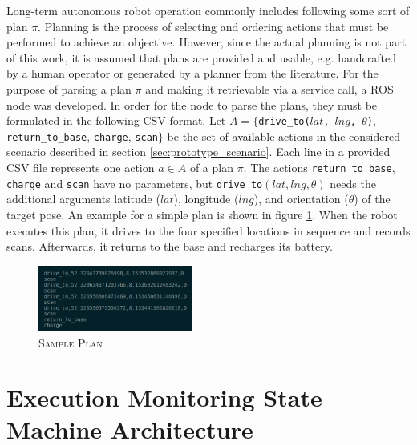 \documentclass[english, master, utf8]{base/thesis_KBS}
\newcommand{\code}[1]{\colorbox{light-gray}{\texttt{#1}}}
\begin{document}
Long-term autonomous robot operation commonly includes following some sort of plan $\pi$. Planning is the process of selecting and ordering actions that must be performed to
achieve an objective. \cite{GNT:2016} However, since the actual planning is not part of this work, it is assumed that
plans are provided and usable, e.g. handcrafted by a human operator or generated by a planner from the literature.
For the purpose of parsing a plan $\pi$ and making it retrievable via a service call, a ROS node was developed.
In order for the node to parse the plans, they must be formulated in the following CSV format.
Let $A = \{$\code{drive\_to($lat$, $lng$, $\theta$)}, \code{return\_to\_base}, \code{charge}, \code{scan}$\}$ be the set of available actions in the considered scenario
described in section \ref{sec:prototype_scenario}.
Each line in a provided CSV file represents one action $a \in A$ of a plan $\pi$. The actions \code{return\_to\_base}, \code{charge} and \code{scan} have no parameters,
but \code{drive\_to$(lat, lng, \theta)$} needs the additional arguments latitude ($lat$), longitude ($lng$), and orientation ($\theta$) of the target pose.
An example for a simple plan is shown in figure \ref{fig:plan_example}. 
When the robot executes this plan, it drives to the four specified locations in sequence and records scans.
Afterwards, it returns to the base and recharges its battery.
\begin{figure}[H]
    \centering
    \includegraphics[width=0.45\textwidth]{pics/plan_example.png}
    \caption{\textsc{Sample Plan}}
    \label{fig:plan_example}
\end{figure}
\noindent

\section{Execution Monitoring State Machine Architecture}
\label{sec:execution_monitoring_smach_architecture}
\end{document}
